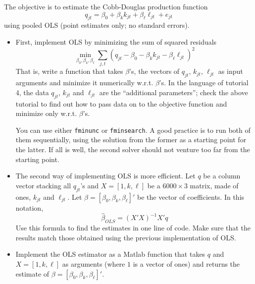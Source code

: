 \documentclass[a4paper, 12pt]{article}
\newcommand{\be}{\begin{equation*}}
\newcommand{\ee}{\end{equation*}}
\begin{document}
The objective is to estimate the Cobb-Douglas production function
	\be
		q_{jt} = \beta_0 + \beta_kk_{jt} + \beta_\ell\ell_{jt} + e_{jt}
	\ee
	using pooled OLS (point estimates only; no standard errors).
\begin{itemize}	
	\item{First, implement OLS by minimizing the sum of squared residuals
	\be
		\min_{\beta_0, \beta_k, \beta_\ell}\sum_{j,t}\left(q_{jt} - \beta_0 - \beta_kk_{jt} - \beta_\ell\ell_{jt} \right)^2
	\ee
	That is, write a function that takes $\beta$'s, the vectors of $q_{jt}$, $k_{jt}$, $\ell_{jt}$ as input arguments and minimize it numerically w.r.t. $\beta$'s. In the language of tutorial 4, the data $q_{jt}$, $k_{jt}$ and $\ell_{jt}$ are the ``additional parameters''; check the above tutorial to find out how to pass data on to the objective function and minimize only w.r.t. $\beta$'s.
	
	You can use either \texttt{fminunc} or \texttt{fminsearch}. A good practice is to run both of them sequentially, using the solution from the former as a starting point for the latter. If all is well, the second solver should not venture too far from the starting point.}
	\item{The second way of implementing OLS is more efficient. Let $q$ be a column vector stacking all $q_{jt}$'s and $X = [1, k, \ell]$ be a $6000\times{3}$ matrix, made of ones, $k_{jt}$ and $\ell_{jt}$. Let $\beta = [\beta_0, \beta_k, \beta_\ell]'$ be the vector of coefficients. In this notation,
	\be
		\widehat\beta_{OLS} = \left(X'X\right)^{-1}X'q
	\ee
	Use this formula to find the estimates in one line of code. Make sure that the results match those obtained using the previous implementation of OLS.}
	\item{Implement the OLS estimator as a Matlab function that takes $q$ and $X = [1, k, \ell]$ as arguments (where $1$ is a vector of ones) and returns the estimate of $\beta = [\beta_0, \beta_k, \beta_\ell]'$.}
\end{itemize}
\end{document}
